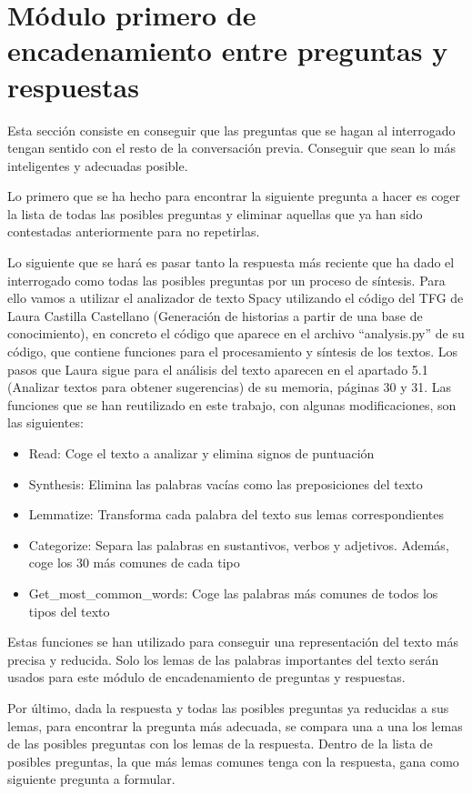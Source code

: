 \section{Módulo primero de encadenamiento entre preguntas y respuestas}
Esta sección consiste en conseguir que las preguntas que se hagan al interrogado tengan sentido con el resto de la conversación previa. Conseguir que sean lo más inteligentes y adecuadas posible. 

Lo primero que se ha hecho para encontrar la siguiente pregunta a hacer es coger la lista de todas las posibles preguntas y eliminar aquellas que ya han sido contestadas anteriormente para no repetirlas. 

Lo siguiente que se hará es pasar tanto la respuesta más reciente que ha dado el interrogado como todas las posibles preguntas por un proceso de síntesis. Para ello vamos a utilizar el analizador de texto Spacy utilizando el código del TFG de Laura Castilla Castellano (Generación de historias a partir de una base de conocimiento), en concreto el código que aparece en el archivo ``analysis.py'' de su código, que contiene funciones para el procesamiento y síntesis de los textos. Los pasos que Laura sigue para el análisis del texto aparecen en el apartado 5.1 (Analizar textos para obtener sugerencias) de su memoria, páginas 30 y 31. Las funciones que se han reutilizado en este trabajo, con algunas modificaciones, son las siguientes:
\begin{itemize}
	\item Read: Coge el texto a analizar y elimina signos de puntuación
	\item Synthesis: Elimina las palabras vacías como las preposiciones del texto
	\item Lemmatize: Transforma cada palabra del texto sus lemas correspondientes
	\item Categorize: Separa las palabras en sustantivos, verbos y adjetivos. Además, coge los 30 más comunes de cada tipo
	\item Get\_most\_common\_words: Coge las palabras más comunes de todos los tipos del texto
\end{itemize}

Estas funciones se han utilizado para conseguir una representación del texto más precisa y reducida. Solo los lemas de las palabras importantes del texto serán usados para este módulo de encadenamiento de preguntas y respuestas.

Por último, dada la respuesta y todas las posibles preguntas ya reducidas a sus lemas, para encontrar la pregunta más adecuada, se compara una a una los lemas de las posibles preguntas con los lemas de la respuesta. Dentro de la lista de posibles preguntas, la que más lemas comunes tenga con la respuesta, gana como siguiente pregunta a formular.

